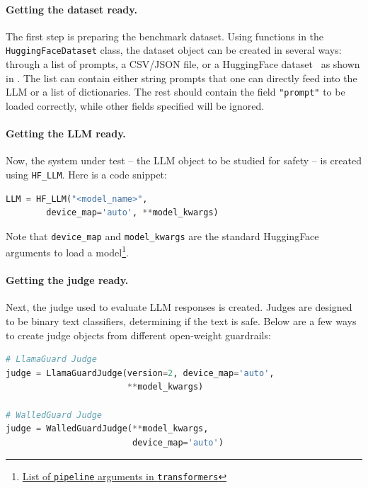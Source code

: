\documentclass[11pt]{article}
\newcommand{\llmcls}{{\color{purple} \texttt{HF\_LLM}}}
\newcommand{\datacls}{{\color{purple} \texttt{HuggingFaceDataset}}}
\begin{document}
\paragraph{Getting the dataset ready.} The first step is preparing the benchmark dataset. Using functions in the \datacls{} class, the dataset object can be created in several ways: through a list of prompts, a CSV/JSON file, or a HuggingFace dataset~\cite{lhoest-etal-2021-datasets} as shown in . The list can contain either string prompts that one can directly feed into the LLM or a list of dictionaries. The rest should contain the field \texttt{"prompt"} to be loaded correctly, while other fields specified will be ignored.

\paragraph{Getting the LLM ready.} Now, the system under test – the LLM object to be studied for safety – is created using \llmcls{}.
%
\lstset{style=mystyle}
%
Here is a code snippet:
\begin{lstlisting}[language=Python, ]
LLM = HF_LLM("<model_name>",
        device_map='auto', **model_kwargs)
\end{lstlisting}
%
Note that \texttt{device\_map} and \texttt{model\_kwargs} are the standard HuggingFace arguments to load a model\footnote{\href{https://huggingface.co/docs/transformers/en/main_classes/pipelines}{List of \texttt{pipeline} arguments in \texttt{transformers}}}.

\paragraph{Getting the judge ready.} Next, the judge used to evaluate LLM responses is created. Judges are designed to be binary text classifiers, determining if the text is safe. Below are a few ways to create judge objects from different open-weight guardrails:

\lstset{style=mystyle}
\begin{lstlisting}[language=Python, ]
# LlamaGuard Judge
judge = LlamaGuardJudge(version=2, device_map='auto', 
                        **model_kwargs)
            
# WalledGuard Judge
judge = WalledGuardJudge(**model_kwargs,
                         device_map='auto')
\end{lstlisting}
\end{document}
